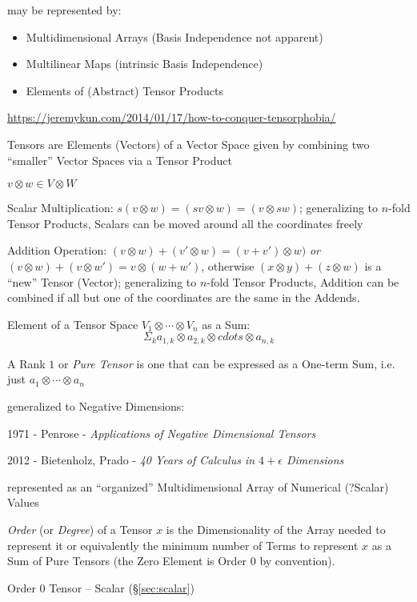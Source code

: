 may be represented by:
\begin{itemize}
  \item Multidimensional Arrays (Basis Independence not apparent)
  \item Multilinear Maps (intrinsic Basis Independence)
  \item Elements of (Abstract) Tensor Products
\end{itemize}

\fist
\url{https://jeremykun.com/2014/01/17/how-to-conquer-tensorphobia/}

Tensors are Elements (Vectors) of a Vector Space given by
combining two ``smaller'' Vector Spaces via a Tensor Product

$v \otimes w \in V \otimes W$

Scalar Multiplication: $s(v \otimes w) = (sv \otimes w) = (v \otimes
sw)$; generalizing to  $n$-fold Tensor Products, Scalars can be moved
around all the coordinates freely

Addition Operation: $(v \otimes w) + (v' \otimes w) = (v + v') \otimes
w)$ \emph{or} $(v \otimes w) + (v \otimes w') = v \otimes (w + w')$,
otherwise $(x \otimes y) + (z \otimes w)$ is a ``new'' Tensor
(Vector); generalizing to $n$-fold Tensor Products, Addition can be
combined if all but one of the coordinates are the same in the
Addends.

Element of a Tensor Space $V_1 \otimes \cdots \otimes V_n$ as a Sum:
\[
  \Sigma_k a_{1,k} \otimes a_{2,k} \otimes cdots \otimes a_{n,k}
\]

A Rank $1$ or \emph{Pure Tensor} is one that can be expressed as a
One-term Sum, i.e. just $a_1 \otimes \cdots \otimes a_n$


\asterism

generalized to Negative Dimensions:

1971 - Penrose - \emph{Applications of Negative Dimensional Tensors}

2012 - Bietenholz, Prado - \emph{40 Years of Calculus in $4 + \epsilon$
  Dimensions}


\asterism


represented as an ``organized'' Multidimensional Array of Numerical
(?Scalar) Values

\emph{Order} (or \emph{Degree}) of a Tensor $x$ is the
Dimensionality of the Array needed to represent it or equivalently the
minimum number of Terms to represent $x$ as a Sum of Pure Tensors (the
Zero Element is Order $0$ by convention).

Order $0$ Tensor -- Scalar (\S\ref{sec:scalar})

